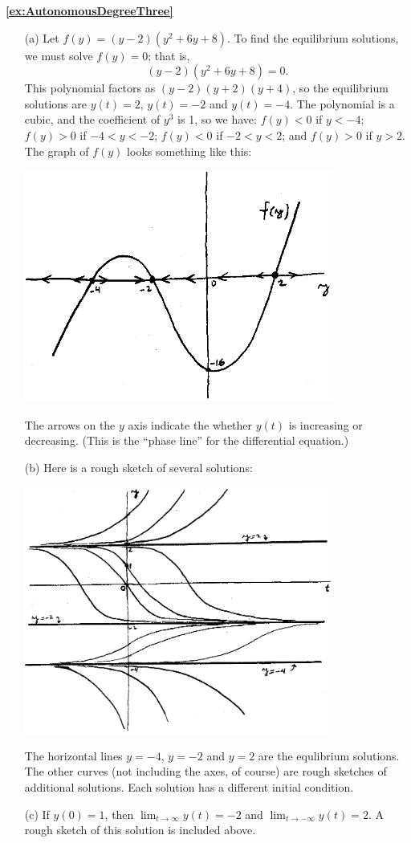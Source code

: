 \documentclass[reqno]{immbook}
\newcommand{\ds}{\displaystyle}
\numberwithin{equation}{chapter}
\numberwithin{question}{section}
\numberwithin{theorem}{chapter}
\numberwithin{figure}{chapter}
\theoremstyle{definition}
\begin{document}
\medskip
\textbf{\ref{ex:AutonomousDegreeThree}}
\begin{enumerate}
\item[(a)]
Let $f(y) = (y-2)(y^2+6y+8)$.
To find the equilibrium solutions, we must solve
$f(y)=0$; that is,
\[
   (y-2)(y^2+6y+8) = 0.
\]
This polynomial factors as $(y-2)(y+2)(y+4)$, so the
equilibrium solutions are $y(t)=2$, $y(t)=-2$ and $y(t)=-4$.
The polynomial is a cubic, and the coefficient of $y^3$ is 1,
so we have: $f(y) < 0$ if $y < -4$;
$f(y) > 0$ if $-4 < y < -2$;
$f(y) < 0$ if $-2 < y < 2$; and
$f(y) > 0$ if $y > 2$.
The graph of $f(y)$ looks something like this:

\centerline{\includegraphics[width=4in]{images/AutonomousDegreeThreePlota.eps}}

The arrows on the $y$ axis indicate the whether
$y(t)$ is increasing or decreasing.
(This is the ``phase line'' for the differential equation.)

\item[(b)]
Here is a rough sketch of several solutions:

\centerline{\includegraphics[width=4in]{images/AutonomousDegreeThreePlotb.eps}}

The horizontal lines $y=-4$, $y=-2$ and $y=2$ are the
equlibrium solutions.  The other curves
(not including the axes, of course) are rough sketches
of additional solutions.
Each solution has a different initial condition.
\item[(c)]
If $y(0)=1$, then $\ds \lim_{t\rightarrow\infty} y(t) = -2$
and $\ds \lim_{t\rightarrow -\infty} y(t) = 2$.
A rough sketch of this solution is included above.
\end{enumerate}
\end{document}
